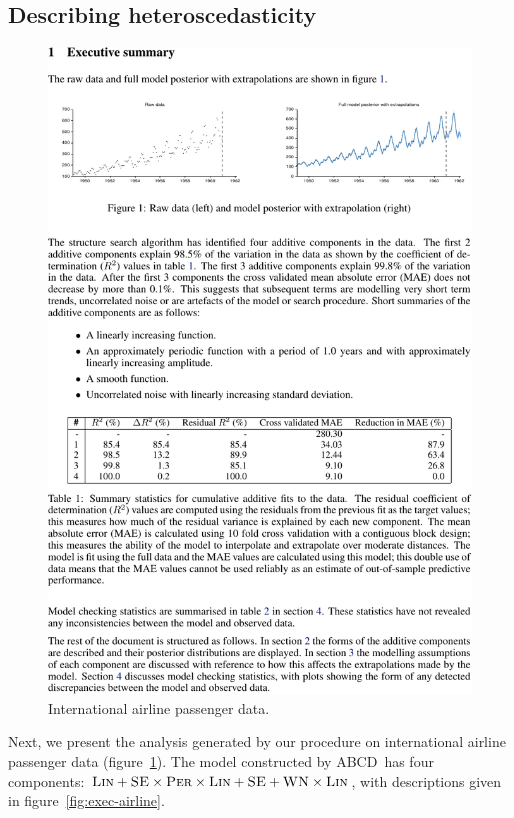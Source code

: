 \documentclass[letterpaper]{article}
\def\eg{e.g.\ }
\newcommand{\procedurename}{ABCD\ }
\begin{document}


\subsection{Describing heteroscedasticity}
\label{sec:airline}

\begin{figure}[h]
\centering
\includegraphics[trim=0.4cm 16.8cm 8cm 2cm, clip, width=0.98\columnwidth, height=0.45\columnwidth]{airlinepages/pg_0002-crop}
\caption{
International airline passenger data.}
\label{fig:airline}
\end{figure}

Next, we present the analysis generated by our procedure on international airline passenger data (figure~\ref{fig:airline}).
The model constructed by \procedurename has four components: ${\textsc{Lin}} + {\textsc{SE}} \times {\textsc{Per}} \times {\textsc{Lin}} + {\textsc{SE}} + {\textsc{WN}} \times {\textsc{Lin}}$, with descriptions given in figure~\ref{fig:exec-airline}.
\end{document}
